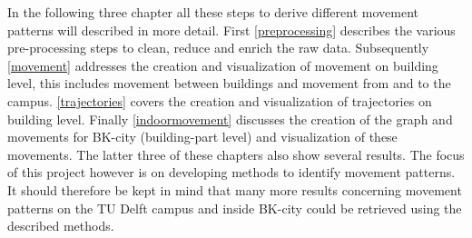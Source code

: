 In the following three chapter all these steps to derive different movement patterns will described in more detail. First \autoref{preprocessing} describes the various pre-processing steps to clean, reduce and enrich the raw data. Subsequently \autoref{movement} addresses the creation and visualization of movement on building level, this includes movement between buildings and movement from and to the campus. \autoref{trajectories} covers the creation and visualization of trajectories on building level. Finally \autoref{indoormovement} discusses the creation of the graph and movements for BK-city (building-part level) and visualization of these movements. The latter three of these chapters also show several results. The focus of this project however is on developing methods to identify movement patterns. It should therefore be kept in mind that many more results concerning movement patterns on the TU Delft campus and inside BK-city could be retrieved using the described methods.